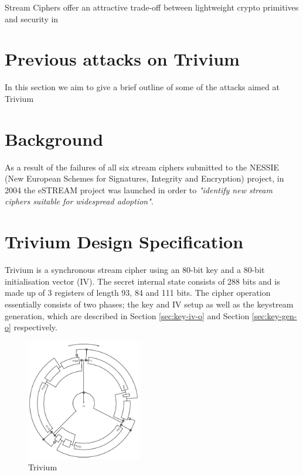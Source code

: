 \documentclass[conference]{IEEEtran}
\begin{document}
Stream Ciphers offer an attractive trade-off between lightweight crypto primitives and security in 


\section{Previous attacks on Trivium}

In this section we aim to give a brief outline of some of the attacks aimed at Trivium 




\section{Background}

As a result of the failures of all six stream ciphers submitted to the NESSIE (New European Schemes for Signatures, Integrity and Encryption) project, in 2004 the eSTREAM project was launched in order to \textit{"identify new stream ciphers suitable for widespread adoption"}\cite{call}.







\section{Trivium Design Specification}

Trivium is a synchronous stream cipher using an 80-bit key and a 80-bit initialisation vector (IV). The secret internal state consists of 288 bits and is made up of 3 registers of length 93, 84 and 111 bits. The cipher operation essentially consists of two phases; the key and IV setup as well as the keystream generation, which are described in Section \ref{sec:key-iv-o} and Section \ref{sec:key-gen-o} respectively.

\begin{figure}
\centering
\includegraphics[width=0.45\textwidth]{figures/round.png}
\caption{Trivium \cite{circle}}
\label{fig:circle}
\end{figure}
\end{document}
